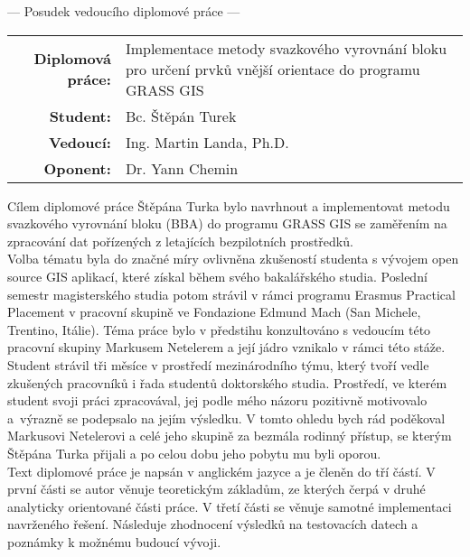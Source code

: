 \documentclass[czech,11pt,a4paper]{article}
\begin{document}
\begin{center}
  {\Large --- Posudek vedoucího diplomové práce ---}
\end{center}

\vspace{.5cm}

\noindent \begin{tabular}{rp{}}
  {\bf Diplomová práce:} & Implementace metody svazkového vyrovnání bloku pro určení prvků vnější orientace do programu GRASS GIS \\
  {\bf Student:} & Bc. Štěpán Turek \\
  {\bf Vedoucí:} & Ing. Martin Landa, Ph.D. \\
  {\bf Oponent:} & Dr. Yann Chemin \\
\end{tabular}

\vspace{1cm}

Cílem diplomové práce Štěpána Turka bylo navrhnout a implementovat
metodu svazkového vyrovnání bloku (BBA) do programu GRASS GIS se
zaměřením na zpracování dat pořízených z letajících bezpilotních
prostředků.
\\

Volba tématu byla do značné míry ovlivněna zkušeností studenta s
vývojem open source GIS aplikací, které získal během svého
bakalářského studia. Poslední semestr magisterského studia potom
strávil v rámci programu Erasmus Practical Placement v pracovní
skupině  ve Fondazione Edmund Mach
(San Michele, Trentino, Itálie). Téma práce bylo v předstihu
konzultováno s vedoucím této pracovní skupiny Markusem Netelerem a
její jádro vznikalo v rámci této stáže. Student strávil tři měsíce v
prostředí mezinárodního týmu, který tvoří vedle zkušených pracovníků i
řada studentů doktorského studia. Prostředí, ve kterém student svoji
práci zpracovával, jej podle mého názoru pozitivně motivovalo
a~výrazně se podepsalo na jejím výsledku. V tomto ohledu bych rád
poděkoval Markusovi Netelerovi a celé jeho skupině za bezmála rodinný
přístup, se kterým Štěpána Turka přijali a po celou dobu jeho pobytu
mu byli oporou.
\\

Text diplomové práce je napsán v anglickém jazyce a je členěn do tří
částí. V první části se autor věnuje teoretickým základům, ze kterých
čerpá v druhé analyticky orientované části práce. V třetí části se
věnuje samotné implementaci navrženého řešení. Následuje zhodnocení
výsledků na testovacích datech a poznámky k možnému budoucí vývoji.
\\
\end{document}
